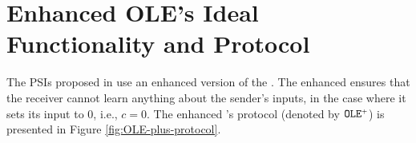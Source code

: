 

\section{Enhanced OLE's Ideal Functionality and Protocol}\label{apndx:F-OLE-plus}



The PSIs proposed in \cite{GhoshN19} use an enhanced version of the  \ole.  The enhanced \ole ensures that the receiver cannot learn anything about the sender's inputs,  in the case where it sets its input to $0$, i.e., $c=0$. The enhanced \ole's protocol (denoted by $\mathtt{OLE}^{\scriptscriptstyle +}$) is presented in Figure \ref{fig:OLE-plus-protocol}.



%






%
%
%
%
%
%
%
%
%
%
%
%




